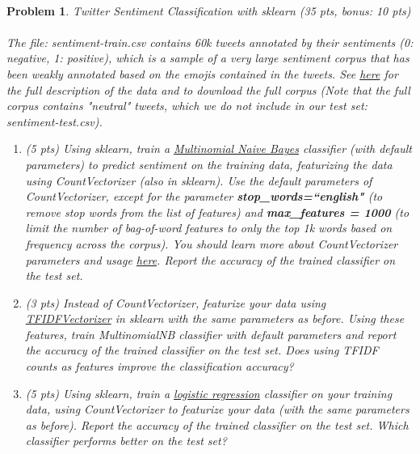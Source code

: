 \documentclass{article}
\newtheorem{problem}{Problem}
\begin{document}
\paragraph{}
\begin{problem} Twitter Sentiment Classification with sklearn (35 pts, bonus:
10 pts)
\\\\
The file: sentiment-train.csv contains 60k tweets annotated by their
sentiments (0: negative, 1: positive), which is a sample of a very large
sentiment corpus that has been weakly annotated based on the emojis contained
in the tweets. See \href{http://help.sentiment140.com/for-students/}{here} for the full description of the data and to download the full corpus (Note that
the full corpus contains "neutral" tweets, which we do not include in our
test set: sentiment-test.csv).
\begin{enumerate}
\item (5 pts) Using sklearn, train a \href{https://scikit-learn.org/stable/modules/generated/sklearn.naive_bayes.MultinomialNB.html}{Multinomial Naive Bayes} classifier (with
default parameters) to predict sentiment on the training data, featurizing
the data using CountVectorizer (also in sklearn). Use the default parameters
of CountVectorizer, except for the parameter \textbf{stop\_words=``english"}
(to remove stop words from the list of features) and \textbf{max\_features
= 1000} (to limit the number of bag-of-word features to only the top 1k words
based on frequency across the corpus).  You should learn more about CountVectorizer
parameters and usage \href{https://scikit-learn.org/stable/modules/generated/sklearn.feature_extraction.text.CountVectorizer.html}{here}. Report the accuracy of the trained classifier on the test set.
\item (3 pts) Instead of CountVectorizer, featurize your data using \href{https://scikit-learn.org/stable/modules/generated/sklearn.feature_extraction.text.TfidfVectorizer.html}{TFIDFVectorizer} in sklearn with the same parameters as before. Using these features, train MultinomialNB classifier with default parameters and report the accuracy of the trained classifier on the test set. Does using TFIDF counts as features improve the classification accuracy?
\item (5 pts) Using sklearn, train a \href{https://scikit-learn.org/stable/modules/generated/sklearn.linear_model.LogisticRegression.html}{logistic regression} classifier on your training data, using CountVectorizer to featurize your data (with the same parameters as before). Report the accuracy of the trained classifier on the test set. Which classifier performs better on the test set?

\end{enumerate}
\end{problem}
\end{document}
